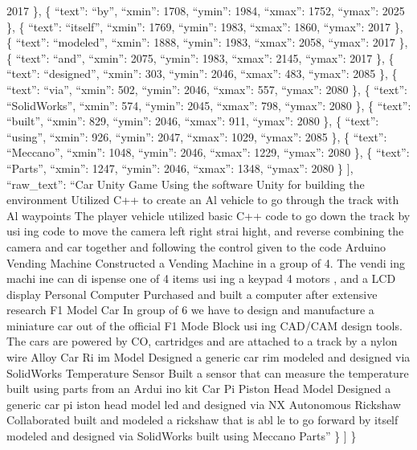 \documentclass[
]{article}
\begin{document}
2017 \}, \{ ``text'': ``by'', ``xmin'': 1708, ``ymin'': 1984, ``xmax'':
1752, ``ymax'': 2025 \}, \{ ``text'': ``itself'', ``xmin'': 1769,
``ymin'': 1983, ``xmax'': 1860, ``ymax'': 2017 \}, \{ ``text'':
``modeled'', ``xmin'': 1888, ``ymin'': 1983, ``xmax'': 2058, ``ymax'':
2017 \}, \{ ``text'': ``and'', ``xmin'': 2075, ``ymin'': 1983, ``xmax'':
2145, ``ymax'': 2017 \}, \{ ``text'': ``designed'', ``xmin'': 303,
``ymin'': 2046, ``xmax'': 483, ``ymax'': 2085 \}, \{ ``text'': ``via'',
``xmin'': 502, ``ymin'': 2046, ``xmax'': 557, ``ymax'': 2080 \}, \{
``text'': ``SolidWorks'', ``xmin'': 574, ``ymin'': 2045, ``xmax'': 798,
``ymax'': 2080 \}, \{ ``text'': ``built'', ``xmin'': 829, ``ymin'':
2046, ``xmax'': 911, ``ymax'': 2080 \}, \{ ``text'': ``using'',
``xmin'': 926, ``ymin'': 2047, ``xmax'': 1029, ``ymax'': 2085 \}, \{
``text'': ``Meccano'', ``xmin'': 1048, ``ymin'': 2046, ``xmax'': 1229,
``ymax'': 2080 \}, \{ ``text'': ``Parts'', ``xmin'': 1247, ``ymin'':
2046, ``xmax'': 1348, ``ymax'': 2080 \} {]}, ``raw\_text'': ``Car Unity
Game Using the software Unity for building the environment Utilized C++
to create an Al vehicle to go through the track with Al waypoints The
player vehicle utilized basic C++ code to go down the track by usi ing
code to move the camera left right strai hight, and reverse combining
the camera and car together and following the control given to the code
Arduino Vending Machine Constructed a Vending Machine in a group of 4.
The vendi ing machi ine can di ispense one of 4 items usi ing a keypad 4
motors , and a LCD display Personal Computer Purchased and built a
computer after extensive research F1 Model Car In group of 6 we have to
design and manufacture a miniature car out of the official F1 Mode Block
usi ing CAD/CAM design tools. The cars are powered by CO, cartridges and
are attached to a track by a nylon wire Alloy Car Ri im Model Designed a
generic car rim \textbar{} modeled and designed via SolidWorks
Temperature Sensor Built a sensor that can measure the temperature built
using parts from an Ardui ino kit Car Pi Piston Head Model Designed a
generic car pi iston head model led and designed via NX Autonomous
Rickshaw Collaborated built and modeled a rickshaw that is abl le to go
forward by itself modeled and designed via SolidWorks built using
Meccano Parts'' \} {]} \}
\end{document}
